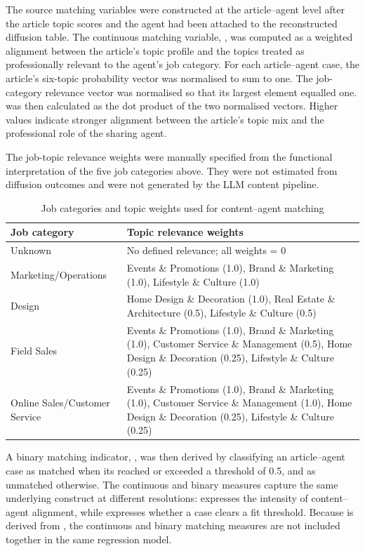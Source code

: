 The source matching variables were constructed at the article–agent level after the article topic scores and the agent  had been attached to the reconstructed diffusion table. The continuous matching variable, , was computed as a weighted alignment between the article's topic profile and the topics treated as professionally relevant to the agent's job category. For each article–agent case, the article's six-topic probability vector was normalised to sum to one. The job-category relevance vector was normalised so that its largest element equalled one.  was then calculated as the dot product of the two normalised vectors. Higher values indicate stronger alignment between the article's topic mix and the professional role of the sharing agent.

The job-topic relevance weights were manually specified from the functional interpretation of the five job categories above. They were not estimated from diffusion outcomes and were not generated by the LLM content pipeline.

\begin{table}[H]
\centering
\small
\caption{Job categories and topic weights used for content–agent matching}
\label{tab:4-4}
\renewcommand{\arraystretch}{1.15}
\begin{tabularx}{\textwidth}{>{\raggedright\arraybackslash}p{}>{\raggedright\arraybackslash}X}
\toprule
Job category & Topic relevance weights \\
\midrule
Unknown & No defined relevance; all weights = 0 \\
Marketing/Operations & Events \& Promotions (1.0), Brand \& Marketing (1.0), Lifestyle \& Culture (1.0) \\
Design & Home Design \& Decoration (1.0), Real Estate \& Architecture (0.5), Lifestyle \& Culture (0.5) \\
Field Sales & Events \& Promotions (1.0), Brand \& Marketing (1.0), Customer Service \& Management (0.5), Home Design \& Decoration (0.25), Lifestyle \& Culture (0.25) \\
Online Sales/Customer Service & Events \& Promotions (1.0), Brand \& Marketing (1.0), Customer Service \& Management (1.0), Home Design \& Decoration (0.25), Lifestyle \& Culture (0.25) \\
\bottomrule
\end{tabularx}
\end{table}

A binary matching indicator, , was then derived by classifying an article–agent case as matched when its  reached or exceeded a threshold of 0.5, and as unmatched otherwise. The continuous and binary measures capture the same underlying construct at different resolutions:  expresses the intensity of content–agent alignment, while  expresses whether a case clears a fit threshold. Because  is derived from , the continuous and binary matching measures are not included together in the same regression model.

